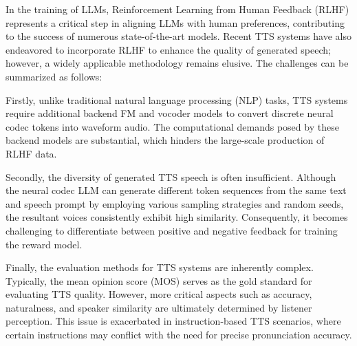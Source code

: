 \documentclass[a4paper]{article}
\begin{document}
In the training of LLMs, Reinforcement Learning from Human Feedback (RLHF) \cite{ziegler2020finetuninglanguagemodelshuman} represents a critical step in aligning LLMs with human preferences, contributing to the success of numerous state-of-the-art models. Recent TTS systems have also endeavored to incorporate RLHF to enhance the quality of generated speech; however, a widely applicable methodology remains elusive. The challenges can be summarized as follows:

Firstly, unlike traditional natural language processing (NLP) tasks, TTS systems require additional backend  FM  and vocoder models to convert discrete neural codec tokens into waveform audio. The computational demands posed by these backend models are substantial, which hinders the large-scale production of RLHF data.

Secondly, the diversity of generated TTS speech is often insufficient. Although the neural codec LLM can generate different token sequences from the same text and speech prompt by employing various sampling strategies and random seeds, the resultant voices consistently exhibit high similarity. Consequently, it becomes challenging to differentiate between positive and negative feedback for training the reward model.

Finally, the evaluation methods for TTS systems are inherently complex. Typically, the mean opinion score (MOS) serves as the gold standard for evaluating TTS quality. However, more critical aspects such as accuracy, naturalness, and speaker similarity are ultimately determined by listener perception. This issue is exacerbated in instruction-based TTS scenarios, where certain instructions may conflict with the need for precise pronunciation accuracy.

\end{document}
